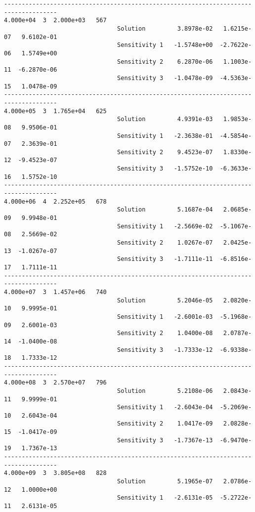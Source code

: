 \begin{verbatim}
-------------------------------------------------------------------------------------
4.000e+04  3  2.000e+03   567
                                Solution         3.8978e-02   1.6215e-07   9.6102e-01 
                                Sensitivity 1   -1.5748e+00  -2.7622e-06   1.5749e+00 
                                Sensitivity 2    6.2870e-06   1.1003e-11  -6.2870e-06 
                                Sensitivity 3   -1.0478e-09  -4.5363e-15   1.0478e-09 
-------------------------------------------------------------------------------------
4.000e+05  3  1.765e+04   625
                                Solution         4.9391e-03   1.9853e-08   9.9506e-01 
                                Sensitivity 1   -2.3638e-01  -4.5854e-07   2.3639e-01 
                                Sensitivity 2    9.4523e-07   1.8330e-12  -9.4523e-07 
                                Sensitivity 3   -1.5752e-10  -6.3633e-16   1.5752e-10 
-------------------------------------------------------------------------------------
4.000e+06  4  2.252e+05   678
                                Solution         5.1687e-04   2.0685e-09   9.9948e-01 
                                Sensitivity 1   -2.5669e-02  -5.1067e-08   2.5669e-02 
                                Sensitivity 2    1.0267e-07   2.0425e-13  -1.0267e-07 
                                Sensitivity 3   -1.7111e-11  -6.8516e-17   1.7111e-11 
-------------------------------------------------------------------------------------
4.000e+07  3  1.457e+06   740
                                Solution         5.2046e-05   2.0820e-10   9.9995e-01 
                                Sensitivity 1   -2.6001e-03  -5.1968e-09   2.6001e-03 
                                Sensitivity 2    1.0400e-08   2.0787e-14  -1.0400e-08 
                                Sensitivity 3   -1.7333e-12  -6.9338e-18   1.7333e-12 
-------------------------------------------------------------------------------------
4.000e+08  3  2.570e+07   796
                                Solution         5.2108e-06   2.0843e-11   9.9999e-01 
                                Sensitivity 1   -2.6043e-04  -5.2069e-10   2.6043e-04 
                                Sensitivity 2    1.0417e-09   2.0828e-15  -1.0417e-09 
                                Sensitivity 3   -1.7367e-13  -6.9470e-19   1.7367e-13 
-------------------------------------------------------------------------------------
4.000e+09  3  3.805e+08   828
                                Solution         5.1965e-07   2.0786e-12   1.0000e+00 
                                Sensitivity 1   -2.6131e-05  -5.2722e-11   2.6131e-05 

\end{verbatim}
